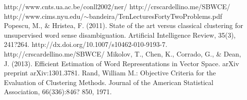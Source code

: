 \documentclass[]{article}
\begin{document}
	
	\begin{thebibliography}{1}
		 http://www.cnts.ua.ac.be/conll2002/ner/
		 http://crscardellino.me/SBWCE/
		http://www.cims.nyu.edu/$\sim$bandeira/TenLecturesFortyTwoProblems.pdf
		 Popescu, M., \& Hristea, F. (2011). State of the art versus classical clustering for unsupervised word sense disambiguation. Artificial Intelligence Review, 35(3), 241?264. http://dx.doi.org/10.1007/s10462-010-9193-7.  
		 http://crscardellino.me/SBWCE/
		 Mikolov, T., Chen, K., Corrado, G., \& Dean, J. (2013). Efficient Estimation of Word Representations in Vector Space. arXiv preprint arXiv:1301.3781. 
		Rand, William M.: Objective Criteria for the Evaluation of Clustering Methods. Journal of the American Statistical Association, 66(336):846? 850, 1971.
	\end{thebibliography} 
	
	
\end{document}

